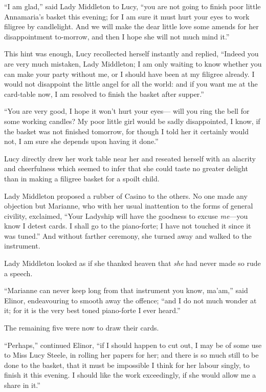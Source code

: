``I am glad,'' said Lady Middleton to Lucy,
``you are not going to finish poor little Annamaria's
basket this evening; for I am sure it must hurt your
eyes to work filigree by candlelight.  And we will make
the dear little love some amends for her disappointment
to-morrow, and then I hope she will not much mind it.''

This hint was enough, Lucy recollected herself instantly
and replied, ``Indeed you are very much mistaken,
Lady Middleton; I am only waiting to know whether you can
make your party without me, or I should have been at my
filigree already.  I would not disappoint the little angel
for all the world: and if you want me at the card-table now,
I am resolved to finish the basket after supper.''

``You are very good, I hope it won't hurt your eyes---%
will you ring the bell for some working candles?
My poor little girl would be sadly disappointed, I know,
if the basket was not finished tomorrow, for though I
told her it certainly would not, I am sure she depends
upon having it done.''

Lucy directly drew her work table near her
and reseated herself with an alacrity and cheerfulness
which seemed to infer that she could taste no greater
delight than in making a filigree basket for a spoilt child.

Lady Middleton proposed a rubber of Casino to the others.
No one made any objection but Marianne, who with her usual
inattention to the forms of general civility, exclaimed,
``Your Ladyship will have the goodness to excuse \emph{me}---you
know I detest cards.  I shall go to the piano-forte;
I have not touched it since it was tuned.''  And without
farther ceremony, she turned away and walked to the instrument.

Lady Middleton looked as if she thanked heaven
that \emph{she} had never made so rude a speech.

``Marianne can never keep long from that instrument
you know, ma'am,'' said Elinor, endeavouring to smooth
away the offence; ``and I do not much wonder at it; for it
is the very best toned piano-forte I ever heard.''

The remaining five were now to draw their cards.

``Perhaps,'' continued Elinor, ``if I should happen
to cut out, I may be of some use to Miss Lucy Steele,
in rolling her papers for her; and there is so much still
to be done to the basket, that it must be impossible
I think for her labour singly, to finish it this evening.
I should like the work exceedingly, if she would allow
me a share in it.''

